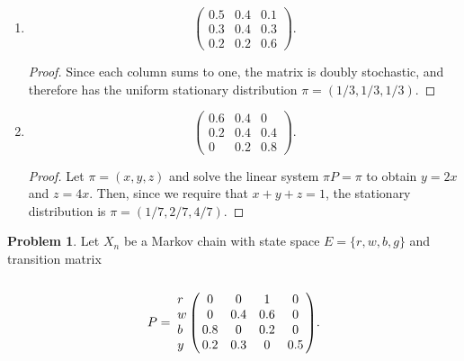 \documentclass[oneside,reqno]{amsart}
\theoremstyle{definition}
\newtheorem{prob}{Problem}
\begin{document}
\begin{enumerate}
\item
\[
	\begin{pmatrix}
		0.5 & 0.4 & 0.1 \\
		0.3 & 0.4 & 0.3 \\
		0.2 & 0.2 & 0.6
	\end{pmatrix}.
\]
\begin{proof}
Since each column sums to one, the matrix is doubly stochastic, and therefore has the uniform stationary distribution $\pi = (1/3, 1/3, 1/3)$.
\end{proof}
\item
\[
	\begin{pmatrix}
		0.6 & 0.4 & 0 \\
		0.2 & 0.4 & 0.4 \\
		0 & 0.2 & 0.8
	\end{pmatrix}.
\]
\begin{proof}
Let $\pi = (x,y,z)$ and solve the linear system $\pi P = \pi$ to obtain $y = 2x$ and $z = 4x$. Then, since we require that $x + y + z =1$, the stationary distribution is $\pi = (1/7, 2/7, 4/7)$.
\end{proof}
\end{enumerate}


\begin{prob}
Let $X_n$ be a Markov chain with state space $E = \{r, w, b, g\}$ and transition matrix 
\[
	P = \bordermatrix{~ \cr
		r & 0 & 0 & 1 & 0 \cr
		w & 0 & 0.4 & 0.6 & 0 \cr
		b & 0.8 & 0 & 0.2 & 0 \cr
		y & 0.2 & 0.3 & 0 & 0.5 \cr}.
\]
\end{prob}
\end{document}
